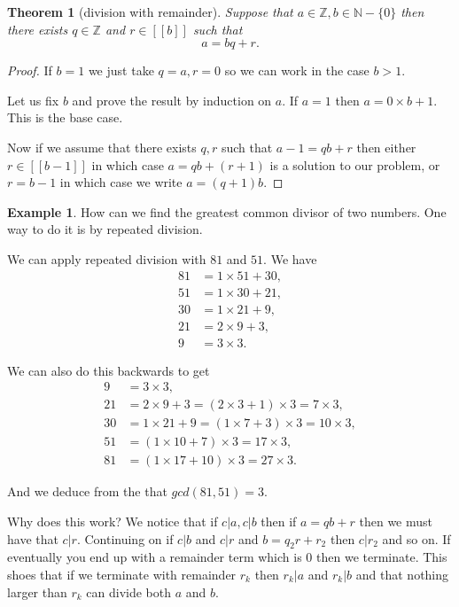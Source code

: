 \documentclass[
]{book}
\newtheorem{theorem}{Theorem}[chapter]
\theoremstyle{definition}
\theoremstyle{definition}
\newtheorem{example}{Example}[chapter]
\theoremstyle{definition}
\theoremstyle{definition}
\theoremstyle{remark}
\begin{document}
\begin{theorem}[division with remainder]
Suppose that \(a \in \mathbb{Z}, b \in \mathbb{N}-\{0\}\) then there exists \(q \in \mathbb{Z}\) and \(r \in [[b]]\) such that
\[ a =bq+r.  \]
\end{theorem}

\begin{proof}
If \(b=1\) we just take \(q=a, r=0\) so we can work in the case \(b >1\).

Let us fix \(b\) and prove the result by induction on \(a\). If \(a=1\) then \(a=0\times b+1\). This is the base case.

Now if we assume that there exists \(q,r\) such that \(a-1 = qb +r\) then either \(r \in [[b-1]]\) in which case \(a = qb + (r+1)\) is a solution to our problem, or \(r=b-1\) in which case we write \(a = (q+1)b\).
\end{proof}

\begin{example}
How can we find the greatest common divisor of two numbers. One way to do it is by repeated division.

We can apply repeated division with \(81\) and \(51\). We have
\begin{align*}
81 & = 1 \times 51 + 30,\\
51 & = 1 \times 30 + 21,\\
30 & = 1 \times 21 + 9,\\
21 & = 2 \times 9 + 3,\\
9 & = 3 \times 3.
\end{align*}

We can also do this backwards to get
\begin{align*}
9 & = 3 \times 3,\\
21 & = 2 \times 9 + 3 = (2 \times 3 +1) \times 3 = 7 \times 3,\\
30 & = 1 \times 21 + 9 = (1 \times 7 + 3) \times 3 = 10 \times 3,\\
51 & = (1 \times  10 + 7) \times 3 = 17 \times 3,\\
81 & = (1 \times 17 + 10) \times 3 = 27 \times 3.
\end{align*}

And we deduce from the that \(gcd(81,51) = 3\).

Why does this work? We notice that if \(c|a, c|b\) then if \(a=qb+r\) then we must have that \(c|r\). Continuing on if \(c|b\) and \(c|r\) and \(b=q_2 r+ r_2\) then \(c|r_2\) and so on. If eventually you end up with a remainder term which is 0 then we terminate. This shoes that if we terminate with remainder \(r_k\) then \(r_k|a\) and \(r_k| b\) and that nothing larger than \(r_k\) can divide both \(a\) and \(b\).
\end{example}
\end{document}
